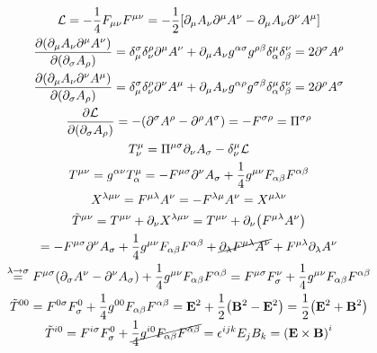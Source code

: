\documentclass{report}
\theoremstyle{definition}
\begin{document}
\begin{chapter10}
	\begin{gather*}
		{\cal L} = -\frac{1}{4}F_{\mu\nu}F^{\mu\nu} = -\frac{1}{2}\bqty{\partial_{\mu}A_{\nu}\partial^{\mu}A^{\nu} - \partial_{\mu}A_{\nu}\partial^{\nu}A^{\mu}} \\
		\pdv{\pqty{\partial_{\mu}A_{\nu}\partial^{\mu}A^{\nu}}}{\pqty{\partial_{\sigma}A_{\rho}}} = \delta^{\sigma}_{\mu}\delta^{\rho}_{\nu}\partial^{\mu}A^{\nu} + \partial_{\mu}A_{\nu}g^{\alpha\sigma}g^{\rho\beta}\delta^{\mu}_{\alpha}\delta^{\nu}_{\beta}= 2\partial^{\sigma}A^{\rho} \\
		\pdv{\pqty{\partial_{\mu}A_{\nu}\partial^{\nu}A^{\mu}}}{\pqty{\partial_{\sigma}A_{\rho}}} = \delta^{\sigma}_{\mu}\delta^{\rho}_{\nu}\partial^{\nu}A^{\mu} + \partial_{\mu}A_{\nu}g^{\alpha\rho}g^{\sigma\beta}\delta^{\mu}_{\alpha}\delta^{\nu}_{\beta}= 2\partial^{\rho}A^{\sigma} \\
		\pdv{\cal L}{\pqty{\partial_{\sigma}A_{\rho}}} = -\pqty{\partial^{\sigma}A^{\rho} - \partial^{\rho}A^{\sigma}} = - F^{\sigma\rho} = \Pi^{\sigma\rho} \\
		T^{\mu}_{\nu} = \Pi^{\mu\sigma}\partial_{\nu}A_{\sigma} - \delta^{\mu}_{\nu}{\cal L} \\
		T^{\mu\nu} = g^{\alpha\nu}T^{\mu}_{\alpha} = -F^{\mu\sigma}\partial^{\nu}A_{\sigma} + \frac{1}{4}g^{\mu\nu}F_{\alpha\beta}F^{\alpha\beta} \\
		X^{\lambda\mu\nu} = F^{\mu\lambda}A^{\nu} = -F^{\lambda\mu}A^{\nu} = X^{\mu\lambda\nu} \\
		\tilde{T}^{\mu\nu} = T^{\mu\nu} + \partial_{\nu}X^{\lambda\mu\nu} = T^{\mu\nu} + \partial_{\nu}\pqty{F^{\mu\lambda}A^{\nu}} \\
		= -F^{\mu\sigma}\partial^{\nu}A_{\sigma} + \frac{1}{4}g^{\mu\nu}F_{\alpha\beta}F^{\alpha\beta} + \cancel{\partial_\lambda F^{\mu\lambda}A^{\nu}} + F^{\mu\lambda}\partial_{\lambda}A^{\nu} \\
		\stackrel{\lambda\to\sigma}{=} F^{\mu\sigma}\pqty{\partial_{\sigma}A^{\nu} - \partial^{\nu}A_{\sigma}} + \frac{1}{4}g^{\mu\nu}F_{\alpha\beta}F^{\alpha\beta} = F^{\mu\sigma}F^{\nu}_{\sigma} + \frac{1}{4}g^{\mu\nu}F_{\alpha\beta}F^{\alpha\beta} \\ 
		\tilde{T}^{00} = F^{0\sigma}F^0_{\sigma} + \frac{1}{4}g^{00}F_{\alpha\beta}F^{\alpha\beta} = {\bf E}^2 + \frac{1}{2}\pqty{{\bf B}^2 - {\bf E}^2} = \frac{1}{2}\pqty{{\bf E}^2 + {\bf B}^2} \\
		\tilde{T}^{i0} = F^{i\sigma}F^0_\sigma + \cancel{\frac{1}{4}g^{i0}F_{\alpha\beta}F^{\alpha\beta}} = \epsilon^{ijk}E_j B_k = \pqty{\bf E \times B}^i
	\end{gather*}
\end{chapter10}
\end{document}
